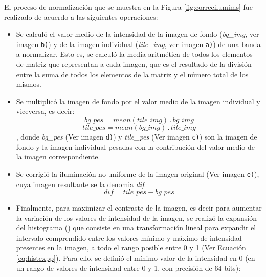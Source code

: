 El proceso de normalización que se muestra en la Figura \ref{fig:correcilumims} fue realizado de acuerdo a las siguientes operaciones:
\begin{itemize}
\justifying
\item Se calculó el valor medio de la intensidad de la imagen de fondo (\textit{bg\_img}, ver imagen \texttt{b)}) y de la imagen individual (\textit{tile\_img}, ver imagen \texttt{a)}) de una banda a normalizar. Esto es, se calculó la media aritmética de todos los elementos de matriz que representan a cada imagen, que es el resultado de la división entre la suma de todos los elementos de la matriz y el número total de los mismos.
\item Se multiplicó la imagen de fondo por el valor medio de la imagen individual y viceversa, es decir:
\begin{equation}
\textit{bg\_pes} = mean(\textit{tile\_img})\hspace{2pt} . \hspace{2pt}\textit{bg\_img}
\end{equation}
\begin{equation}
\textit{tile\_pes} = mean(\textit{bg\_img})\hspace{2pt} . \hspace{2pt}\textit{tile\_img}
\end{equation},
donde \textit{bg\_pes} (Ver imagen \texttt{d)}) y \textit{tile\_pes} (Ver imagen \texttt{c)}) son la imagen de fondo y la imagen individual pesadas con la contribución del valor medio de la imagen correspondiente.
\item Se corrigió la iluminación no uniforme de la imagen original (Ver imagen \texttt{e)}), cuya imagen resultante se la denomia \textit{dif}:
\begin{equation}
\textit{dif} = \textit{tile\_pes} - \textit{bg\_pes}
\end{equation}
\item Finalmente, para maximizar el contraste de la imagen, es decir para aumentar la variación de los valores de intensidad de la imagen, se realizó la expansión del histograma (\cite{anilfund}) que consiste en una transformación lineal para expandir el intervalo comprendido entre los valores mínimo y máximo de intensidad presentes en la imagen, a todo el rango posible entre 0 y 1 (Ver Ecuación \ref{eq:histexpp}). Para ello, se definió el mínimo valor de la intensidad en 0 (en un rango de valores de intensidad entre 0 y 1, con precisión de 64 bits):
\begin{equation}

\end{equation}
\end{itemize}
